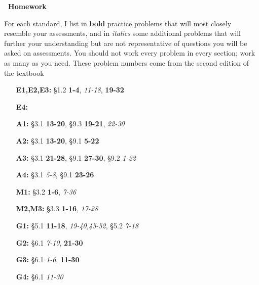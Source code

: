 \documentclass{article}
\begin{document}
\begin{center}
{\Large \bf \course\  Homework} \\
\sem
\end{center}

For each standard, I list in {\bf bold} practice problems that will most closely resemble your assessments, and in {\em italics} some additional problems that will further your understanding but are not representative of questions you will be asked on assessments.  You should not work every problem in every section; work as many as you need.  These problem numbers come from the second edition of the textbook

\begin{enumerate}
\item [{\bf E1,E2,E3:} ] \S 1.2 {\bf 1-4}, {\em 11-18}, {\bf 19-32}
\item [{\bf E4:} ]

\item[{\bf A1: }] \S 3.1 {\bf 13-20}, \S 9.3 {\bf 19-21}, {\em 22-30}
\item[{\bf A2: }] \S 3.1 {\bf 13-20}, \S 9.1 {\bf 5-22}
\item[{\bf A3: }] \S 3.1 {\bf 21-28}, \S 9.1 {\bf 27-30}, \S 9.2 {\em 1-22}
\item[{\bf A4: }] \S 3.1 {\em 5-8}, \S 9.1 {\bf 23-26}
\item[{\bf M1: }] \S 3.2 {\bf 1-6}, {\em 7-36}
\item[{\bf M2,M3: }] \S 3.3 {\bf 1-16}, {\em 17-28}
\item[{\bf G1: }] \S 5.1 {\bf 11-18}, {\em 19-40,45-52}, \S 5.2 {\em 7-18}
\item[{\bf G2: }] \S 6.1 {\em 7-10}, {\bf 21-30}
\item[{\bf G3: }] \S 6.1 {\em 1-6}, {\bf 11-30}
\item[{\bf G4: }] \S 6.1 {\em 11-30}
\end{enumerate} 
\end{document}
